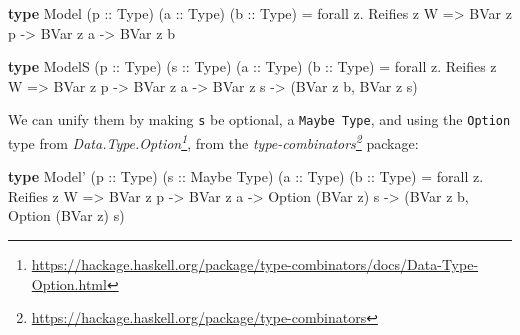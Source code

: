 \documentclass[]{article}
\newenvironment{Shaded}{}{}
\newcommand{\DataTypeTok}[1]{\textcolor[rgb]{0.56,0.13,0.00}{#1}}
\newcommand{\FunctionTok}[1]{\textcolor[rgb]{0.02,0.16,0.49}{#1}}
\newcommand{\KeywordTok}[1]{\textcolor[rgb]{0.00,0.44,0.13}{\textbf{#1}}}
\newcommand{\NormalTok}[1]{#1}
\newcommand{\OtherTok}[1]{\textcolor[rgb]{0.00,0.44,0.13}{#1}}
\renewcommand{\href}[2]{#2\footnote{\url{#1}}}
\begin{document}
\begin{Shaded}
\begin{Highlighting}[]
\KeywordTok{type} \DataTypeTok{Model}\NormalTok{ (}\OtherTok{p ::} \DataTypeTok{Type}\NormalTok{) (}\OtherTok{a ::} \DataTypeTok{Type}\NormalTok{) (}\OtherTok{b ::} \DataTypeTok{Type}\NormalTok{) }\FunctionTok{=}
\NormalTok{       forall z}\FunctionTok{.} \DataTypeTok{Reifies}\NormalTok{ z }\DataTypeTok{W}
    \OtherTok{=>} \DataTypeTok{BVar}\NormalTok{ z p}
    \OtherTok{->} \DataTypeTok{BVar}\NormalTok{ z a}
    \OtherTok{->} \DataTypeTok{BVar}\NormalTok{ z b}

\KeywordTok{type} \DataTypeTok{ModelS}\NormalTok{ (}\OtherTok{p ::} \DataTypeTok{Type}\NormalTok{) (}\OtherTok{s ::} \DataTypeTok{Type}\NormalTok{) (}\OtherTok{a ::} \DataTypeTok{Type}\NormalTok{) (}\OtherTok{b ::} \DataTypeTok{Type}\NormalTok{) }\FunctionTok{=}
\NormalTok{       forall z}\FunctionTok{.} \DataTypeTok{Reifies}\NormalTok{ z }\DataTypeTok{W}
    \OtherTok{=>} \DataTypeTok{BVar}\NormalTok{ z p}
    \OtherTok{->} \DataTypeTok{BVar}\NormalTok{ z a}
    \OtherTok{->} \DataTypeTok{BVar}\NormalTok{ z s}
    \OtherTok{->}\NormalTok{ (}\DataTypeTok{BVar}\NormalTok{ z b, }\DataTypeTok{BVar}\NormalTok{ z s)}
\end{Highlighting}
\end{Shaded}

We can unify them by making \texttt{s} be optional, a \texttt{Maybe\ Type}, and
using the \texttt{Option} type from
\emph{\href{https://hackage.haskell.org/package/type-combinators/docs/Data-Type-Option.html}{Data.Type.Option}},
from the
\emph{\href{https://hackage.haskell.org/package/type-combinators}{type-combinators}}
package:

\begin{Shaded}
\begin{Highlighting}[]
\KeywordTok{type} \DataTypeTok{Model'}\NormalTok{ (}\OtherTok{p ::} \DataTypeTok{Type}\NormalTok{) (}\OtherTok{s ::} \DataTypeTok{Maybe} \DataTypeTok{Type}\NormalTok{) (}\OtherTok{a ::} \DataTypeTok{Type}\NormalTok{) (}\OtherTok{b ::} \DataTypeTok{Type}\NormalTok{) }\FunctionTok{=}
\NormalTok{       forall z}\FunctionTok{.} \DataTypeTok{Reifies}\NormalTok{ z }\DataTypeTok{W}
    \OtherTok{=>} \DataTypeTok{BVar}\NormalTok{ z p}
    \OtherTok{->} \DataTypeTok{BVar}\NormalTok{ z a}
    \OtherTok{->} \DataTypeTok{Option}\NormalTok{ (}\DataTypeTok{BVar}\NormalTok{ z) s}
    \OtherTok{->}\NormalTok{ (}\DataTypeTok{BVar}\NormalTok{ z b, }\DataTypeTok{Option}\NormalTok{ (}\DataTypeTok{BVar}\NormalTok{ z) s)}
\end{Highlighting}
\end{Shaded}
\end{document}
